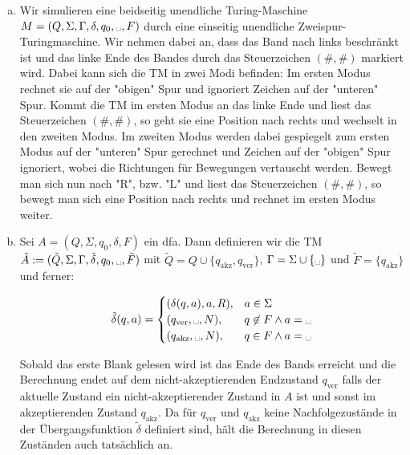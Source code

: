 \documentclass{article}
\begin{document}
\begin{enumerate}[a)]
	\item Wir simulieren eine beidseitig unendliche Turing-Maschine $M = (Q, \Sigma, \Gamma, \delta, q_0, \text{\textvisiblespace}, F)$ durch eine einseitig unendliche Zweispur-Turingmaschine. Wir nehmen dabei an, dass das Band nach links beschränkt ist und das linke Ende des Bandes durch das Steuerzeichen $(\#,\#)$ markiert wird. Dabei kann sich die TM in zwei Modi befinden: Im ersten Modus rechnet sie auf der "obigen" Spur und ignoriert Zeichen auf der "unteren" Spur. Kommt die TM im ersten Modus an das linke Ende und liest das Steuerzeichen $(\#,\#)$, so geht sie eine Position nach rechts und wechselt in den zweiten Modus. Im zweiten Modus werden dabei gespiegelt zum ersten Modus auf der "unteren" Spur gerechnet und Zeichen auf der "obigen" Spur ignoriert, wobei die Richtungen für Bewegungen vertauscht werden. Bewegt man sich nun nach "R", bzw. "L" und liest das Steuerzeichen $(\#,\#)$, so bewegt man sich eine Position nach rechts und rechnet im ersten Modus weiter.
	
	\item Sei $A = (Q, \Sigma, q_0, \delta, F)$ ein dfa. Dann definieren wir die TM $\tilde{A} := (\tilde{Q}, \Sigma, \Gamma, \tilde{\delta}, q_0, \text{\textvisiblespace}, \tilde{F})$ mit $\tilde{Q} = Q \cup \{q_\text{akz},q_\text{ver}\}$, $\Gamma = \Sigma \cup \{\text{\textvisiblespace}\}$ und $\tilde{F} = \{q_\text{akz}\}$ und ferner:
	
	\begin{align}
		\tilde{\delta}(q,a) = \begin{cases}
			(\delta(q,a),a,R), & a\in \Sigma\\
			(q_\text{ver},\text{\textvisiblespace},N), &q \not\in F \land a = \text{\textvisiblespace}\\
			(q_\text{akz},\text{\textvisiblespace},N), &q \in F \land a = \text{\textvisiblespace}\\
		\end{cases}
	\end{align}
	
	Sobald das erste Blank gelesen wird ist das Ende des Bands erreicht und die Berechnung endet auf dem nicht-akzeptierenden Endzustand $q_\text{ver}$ falls der aktuelle Zustand ein nicht-akzeptierender Zustand in $A$ ist und sonst im akzeptierenden Zustand $q_\text{akz}$. Da für $q_\text{ver}$ und $q_\text{akz}$ keine Nachfolgezustände in der Übergangsfunktion $\tilde{\delta}$ definiert sind, hält die Berechnung in diesen Zuständen auch tatsächlich an.
	

\end{enumerate}
\end{document}
